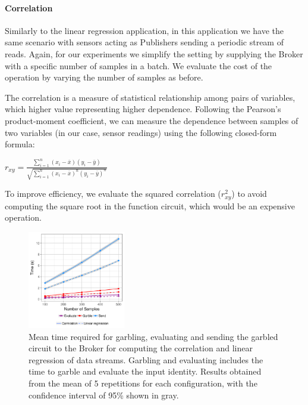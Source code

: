 
\paragraph{Correlation}



Similarly to the linear regression application, in this application we have the
same scenario with sensors acting as Publishers sending a periodic stream of
reads.  Again, for our experiments we simplify the setting by supplying the
Broker with a specific number of samples in a batch.  We evaluate the cost of
the operation by varying the number of samples as before.

The correlation is a measure of statistical relationship among pairs of
variables, which higher value representing higher dependence.  Following the
Pearson's product-moment coefficient, we can measure the dependence between
samples of two variables (in our case, sensor readings) using the following
closed-form formula:

$r_{xy} = \frac{\displaystyle\sum_{i=1}^n (x_i - \bar{x}) (y_i - \bar{y})}
{\sqrt{\displaystyle\sum_{i=1}^n (x_i - \bar{x})^n (y_i - \bar{y})^n}}$

To improve efficiency, we evaluate the squared correlation ($r_{xy}^2$) to avoid
computing the square root in the function circuit, which would be an expensive
operation.

\begin{figure}
  \includegraphics[width=0.38\textwidth]{plots/stream.png}
  \caption{Mean time required for garbling, evaluating and sending the garbled
    circuit to the Broker for computing the correlation and linear regression
    of data streams.  Garbling and evaluating includes the time to garble and
    evaluate the input identity.  Results obtained from the mean of 5
    repetitions for each configuration, with the confidence interval of 95\%
    shown in gray.}
  \label{stream-times}
\end{figure}

